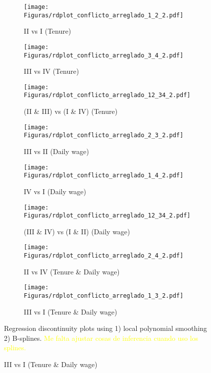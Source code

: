 \documentclass[oneside,11pt]{article}
\begin{document}
\begin{figure}[H]
     \caption{RD plots (Calculator treatment)}
    \label{rd_t2}
\begin{center}
\begin{subfigure}{0.31\textwidth}
\caption{II vs I (Tenure)}
        \texttt{[image: Figuras/rdplot\_conflicto\_arreglado\_1\_2\_2.pdf]}
    \end{subfigure}
    \begin{subfigure}{0.31\textwidth}
\caption{III vs IV (Tenure)}
        \texttt{[image: Figuras/rdplot\_conflicto\_arreglado\_3\_4\_2.pdf]}
    \end{subfigure}
\begin{subfigure}{0.31\textwidth}
\caption{(II \& III) vs (I \& IV)	(Tenure)}
        \texttt{[image: Figuras/rdplot\_conflicto\_arreglado\_12\_34\_2.pdf]}
    \end{subfigure}
    \begin{subfigure}{0.31\textwidth}
\caption{III vs II (Daily wage)}
        \texttt{[image: Figuras/rdplot\_conflicto\_arreglado\_2\_3\_2.pdf]}
    \end{subfigure}        
    \begin{subfigure}{0.31\textwidth}
\caption{IV vs I (Daily wage)}
        \texttt{[image: Figuras/rdplot\_conflicto\_arreglado\_1\_4\_2.pdf]}
    \end{subfigure}    
    \begin{subfigure}{0.31\textwidth}
\caption{(III \& IV) vs (I \& II) (Daily wage)}
        \texttt{[image: Figuras/rdplot\_conflicto\_arreglado\_12\_34\_2.pdf]}
    \end{subfigure}       
\begin{subfigure}{0.31\textwidth}
\caption{II vs IV (Tenure \& Daily wage)}
        \texttt{[image: Figuras/rdplot\_conflicto\_arreglado\_2\_4\_2.pdf]}
    \end{subfigure}
    \begin{subfigure}{0.31\textwidth}
\caption{III vs I (Tenure \& Daily wage)}
        \texttt{[image: Figuras/rdplot\_conflicto\_arreglado\_1\_3\_2.pdf]}
    \end{subfigure}        
  \end{center}
  
    \scriptsize Regression discontinuity plots using 1) local polynomial smoothing 2) B-splines. \textcolor{yellow}{Me falta ajustar cosas de inferencia cuando uso los splines.}
\end{figure}
\end{document}
